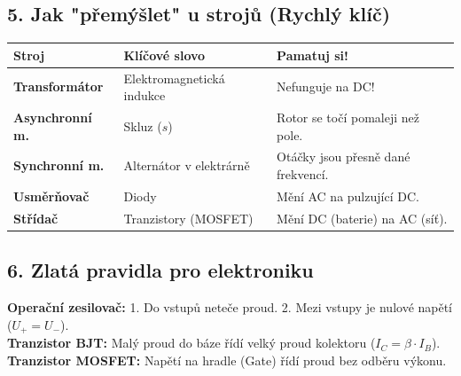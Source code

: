 \documentclass[a4paper,10pt]{article}
\begin{document}
\subsection*{5. Jak "přemýšlet" u strojů (Rychlý klíč)}

\begin{tabularx}{\linewidth}{l X l}
\toprule
\textbf{Stroj} & \textbf{Klíčové slovo} & \textbf{Pamatuj si!} \\
\midrule
\textbf{Transformátor} & Elektromagnetická indukce & Nefunguje na DC! \\
\textbf{Asynchronní m.} & Skluz ($s$) & Rotor se točí pomaleji než pole. \\
\textbf{Synchronní m.} & Alternátor v elektrárně & Otáčky jsou přesně dané frekvencí. \\
\textbf{Usměrňovač} & Diody & Mění AC na pulzující DC. \\
\textbf{Střídač} & Tranzistory (MOSFET) & Mění DC (baterie) na AC (síť). \\
\bottomrule
\end{tabularx}

\subsection*{6. Zlatá pravidla pro elektroniku}

\begin{vzorcebox}
\textbf{Operační zesilovač:} 1. Do vstupů neteče proud. 2. Mezi vstupy je nulové napětí ($U_+ = U_-$). \\
\textbf{Tranzistor BJT:} Malý proud do báze řídí velký proud kolektoru ($I_C = \beta \cdot I_B$). \\
\textbf{Tranzistor MOSFET:} Napětí na hradle (Gate) řídí proud bez odběru výkonu.
\end{vzorcebox}
\end{document}
